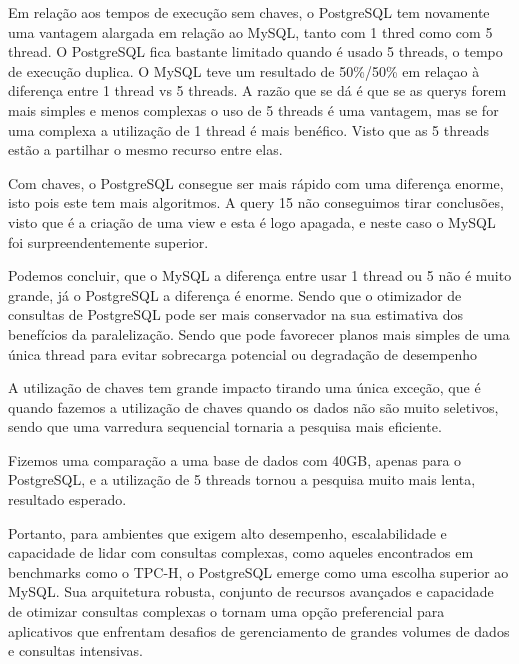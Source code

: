 \documentclass{article}
\begin{document}
Em relação aos tempos de execução sem chaves, o PostgreSQL tem novamente uma vantagem alargada em relação ao MySQL, tanto com 1 thred como com 5 thread. O PostgreSQL fica bastante limitado quando é usado 5 threads, o tempo de execução duplica. O MySQL teve um resultado de 50\%/50\% em relaçao à diferença entre 1 thread vs 5 threads. A razão que se dá é que se as querys forem mais simples e menos complexas o uso de 5 threads é uma vantagem, mas se for uma complexa a utilização de 1 thread é mais benéfico. Visto que as 5 threads estão a partilhar o mesmo recurso entre elas.

Com chaves, o PostgreSQL consegue ser mais rápido com uma diferença enorme, isto pois este tem mais algoritmos. A query 15 não conseguimos tirar conclusões, visto que é a criação de uma view e esta é logo apagada, e neste caso o MySQL foi surpreendentemente superior.

Podemos concluir, que o MySQL a diferença entre usar 1 thread ou 5 não é muito grande, já o PostgreSQL a diferença é enorme. Sendo que  o otimizador de consultas
de PostgreSQL pode ser mais conservador na sua estimativa dos benefícios da paralelização. Sendo
que pode favorecer planos mais simples de uma única thread para evitar sobrecarga potencial ou
degradação de desempenho

A utilização de chaves tem grande impacto tirando uma única exceção, que é quando fazemos a utilização de chaves quando os dados não são muito seletivos, sendo que uma varredura sequencial tornaria a pesquisa mais eficiente.

Fizemos uma comparação a uma base de dados com 40GB, apenas para o PostgreSQL, e a utilização de 5 threads tornou a pesquisa muito mais lenta, resultado esperado.

Portanto, para ambientes que exigem alto desempenho, escalabilidade e capacidade de lidar com consultas complexas, como aqueles encontrados em benchmarks como o TPC-H, o PostgreSQL emerge como uma escolha superior ao MySQL. Sua arquitetura robusta, conjunto de recursos avançados e capacidade de otimizar consultas complexas o tornam uma opção preferencial para aplicativos que enfrentam desafios de gerenciamento de grandes volumes de dados e consultas intensivas.
\end{document}

